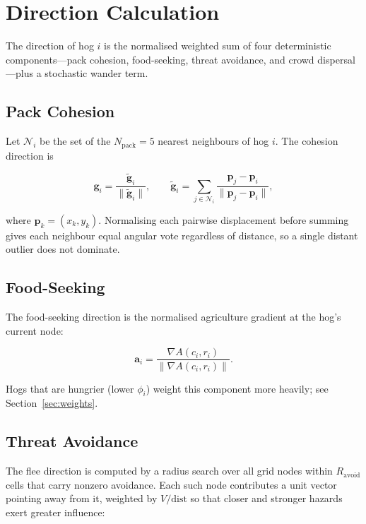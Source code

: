 \documentclass[11pt]{article}
\begin{document}
\section{Direction Calculation}

The direction of hog $i$ is the normalised weighted sum of four deterministic
components---pack cohesion, food-seeking, threat avoidance, and crowd
dispersal---plus a stochastic wander term.

\subsection{Pack Cohesion}

Let $\mathcal{N}_i$ be the set of the $N_{\mathrm{pack}} = 5$ nearest
neighbours of hog $i$.  The cohesion direction is

\[
  \mathbf{g}_i = \frac{\tilde{\mathbf{g}}_i}{\|\tilde{\mathbf{g}}_i\|},
  \qquad
  \tilde{\mathbf{g}}_i
    = \sum_{j \in \mathcal{N}_i} \frac{\mathbf{p}_j - \mathbf{p}_i}
                                      {\|\mathbf{p}_j - \mathbf{p}_i\|},
\]

where $\mathbf{p}_k = (x_k, y_k)$.  Normalising each pairwise displacement
before summing gives each neighbour equal angular vote regardless of distance,
so a single distant outlier does not dominate.

\subsection{Food-Seeking}

The food-seeking direction is the normalised agriculture gradient at the hog's
current node:

\[
  \mathbf{a}_i
    = \frac{\nabla A(c_i, r_i)}{\|\nabla A(c_i, r_i)\|}.
\]

Hogs that are hungrier (lower $\phi_i$) weight this component more heavily;
see Section~\ref{sec:weights}.

\subsection{Threat Avoidance}
\label{sec:avoid_dir}

The flee direction is computed by a radius search over all grid nodes within
$R_{\mathrm{avoid}}$ cells that carry nonzero avoidance.  Each such node
contributes a unit vector pointing away from it, weighted by $V / \mathrm{dist}$
so that closer and stronger hazards exert greater influence:
\end{document}
